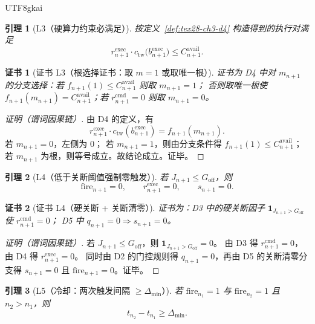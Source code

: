 \documentclass[12pt]{article}
\newtheorem{lemma}{引理}[section]
\newtheorem{Certificate}{证书}[section]
\newcommand{\indicator}[1]{\mathbf{1}_{#1}}
\begin{document}
\begin{CJK*}{UTF8}{gkai}
\begin{lemma}[L3（硬算力约束必满足）]
\label{lem:tex28-ch3-l3}
按定义~\ref{def:tex28-ch3-d4} 构造得到的执行对满足
\[
  r^{\mathrm{exec}}_{n+1}\cdot c_{\mathrm{tw}}\!\bigl(b^{\mathrm{exec}}_{n+1}\bigr)\le C^{\mathrm{avail}}_{n+1}.
\]
\end{lemma}

\begin{Certificate}[证书 L3（根选择证书：取 $m=1$ 或取唯一根）]
\label{cert:tex28-ch3-l3}
证书为 D4 中对 $m_{n+1}$ 的分支选择：若 $f_{n+1}(1)\le C^{\mathrm{avail}}_{n+1}$ 则取 $m_{n+1}=1$；
否则取唯一根使 $f_{n+1}(m_{n+1})=C^{\mathrm{avail}}_{n+1}$；若 $r^{\mathrm{cmd}}_{n+1}=0$ 则取 $m_{n+1}=0$。
\end{Certificate}

\begin{proof}[证明（谓词因果链）]
由 D4 的定义，有
\[
  r^{\mathrm{exec}}_{n+1}\cdot c_{\mathrm{tw}}(b^{\mathrm{exec}}_{n+1})=f_{n+1}(m_{n+1}).
\]
若 $m_{n+1}=0$，左侧为 $0$；
若 $m_{n+1}=1$，则由分支条件得 $f_{n+1}(1)\le C^{\mathrm{avail}}_{n+1}$；
若 $m_{n+1}$ 为根，则等号成立。故结论成立。证毕。
\end{proof}

\begin{lemma}[L4（低于关断阈值强制零触发）]
\label{lem:tex28-ch3-l4}
若 $J_{n+1}\le G_{\mathrm{off}}$，则
\[
  \mathrm{fire}_{n+1}=0,
  \qquad
  r^{\mathrm{exec}}_{n+1}=0,
  \qquad
  s_{n+1}=0.
\]
\end{lemma}

\begin{Certificate}[证书 L4（硬关断 + 关断清零）]
\label{cert:tex28-ch3-l4}
证书为：D3 中的硬关断因子 $\indicator{J_{n+1}>G_{\mathrm{off}}}$ 使 $r^{\mathrm{cmd}}_{n+1}=0$；
D5 中 $q_{n+1}=0\Rightarrow s_{n+1}=0$。
\end{Certificate}

\begin{proof}[证明（谓词因果链）]
若 $J_{n+1}\le G_{\mathrm{off}}$，则 $\indicator{J_{n+1}>G_{\mathrm{off}}}=0$。
由 D3 得 $r^{\mathrm{cmd}}_{n+1}=0$，由 D4 得 $r^{\mathrm{exec}}_{n+1}=0$。
同时由 D2 的门控规则得 $q_{n+1}=0$，再由 D5 的关断清零分支得 $s_{n+1}=0$ 且 $\mathrm{fire}_{n+1}=0$。证毕。
\end{proof}

\begin{lemma}[L5（冷却：两次触发间隔 $\ge\Delta_{\min}$）]
\label{lem:tex28-ch3-l5}
若 $\mathrm{fire}_{n_1}=1$ 与 $\mathrm{fire}_{n_2}=1$ 且 $n_2>n_1$，则
\[
  t_{n_2}-t_{n_1}\ge \Delta_{\min}.
\]
\end{lemma}


\end{CJK*}
\end{document}
